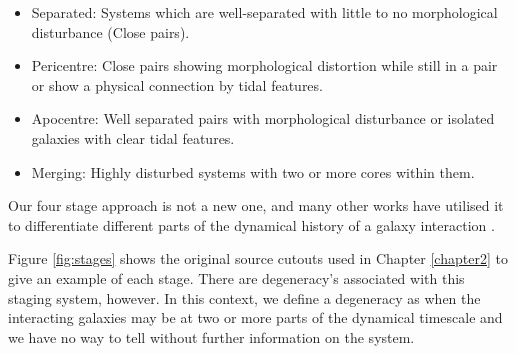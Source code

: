 \begin{itemize}
    \item Separated: Systems which are well-separated with little to no morphological disturbance (Close pairs).
    \item Pericentre: Close pairs showing morphological distortion while still in a pair or show a physical connection by tidal features.
    \item Apocentre: Well separated pairs with morphological disturbance or isolated galaxies with clear tidal features.
    \item Merging: Highly disturbed systems with two or more cores within them.
\end{itemize}

\noindent Our four stage approach is not a new one, and many other works have utilised it to differentiate different parts of the dynamical history of a galaxy interaction \citep{2022ApJ...937...97C, 2023ApJ...952..122G}.

Figure \ref{fig:stages} shows the original source cutouts used in Chapter \ref{chapter2} to give an example of each stage. There are degeneracy's associated with this staging system, however. In this context, we define a degeneracy as when the interacting galaxies may be at two or more parts of the dynamical timescale and we have no way to tell without further information on the system.

